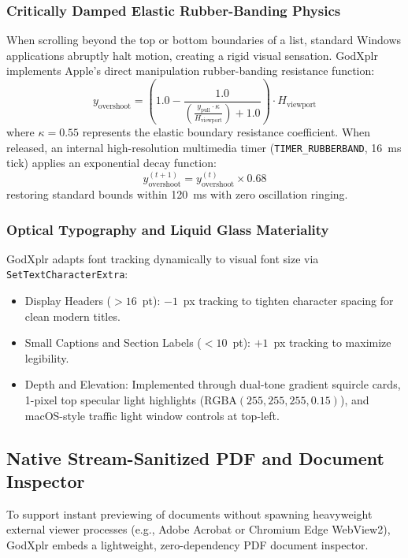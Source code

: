 \documentclass[conference]{IEEEtran}
\begin{document}
\subsubsection{Critically Damped Elastic Rubber-Banding Physics}
When scrolling beyond the top or bottom boundaries of a list, standard Windows applications abruptly halt motion, creating a rigid visual sensation. GodXplr implements Apple's direct manipulation rubber-banding resistance function:
\begin{equation}
\label{eq:rubberband}
y_{\text{overshoot}} = \left(1.0 - \frac{1.0}{\left(\frac{y_{\text{pull}} \cdot \kappa}{H_{\text{viewport}}}\right) + 1.0}\right) \cdot H_{\text{viewport}}
\end{equation}
where $\kappa = 0.55$ represents the elastic boundary resistance coefficient. When released, an internal high-resolution multimedia timer (\texttt{TIMER\_RUBBERBAND}, 16~ms tick) applies an exponential decay function:
\begin{equation}
y_{\text{overshoot}}^{(t + 1)} = y_{\text{overshoot}}^{(t)} \times 0.68
\end{equation}
restoring standard bounds within 120~ms with zero oscillation ringing.

\subsubsection{Optical Typography and Liquid Glass Materiality}
GodXplr adapts font tracking dynamically to visual font size via \texttt{SetTextCharacterExtra}:
\begin{itemize}
    \item Display Headers ($> 16$~pt): $-1$~px tracking to tighten character spacing for clean modern titles.
    \item Small Captions and Section Labels ($< 10$~pt): $+1$~px tracking to maximize legibility.
    \item Depth and Elevation: Implemented through dual-tone gradient squircle cards, 1-pixel top specular light highlights ($\text{RGBA}(255, 255, 255, 0.15)$), and macOS-style traffic light window controls at top-left.
\end{itemize}

\subsection{Native Stream-Sanitized PDF and Document Inspector}
To support instant previewing of documents without spawning heavyweight external viewer processes (e.g., Adobe Acrobat or Chromium Edge WebView2), GodXplr embeds a lightweight, zero-dependency PDF document inspector.
\end{document}
